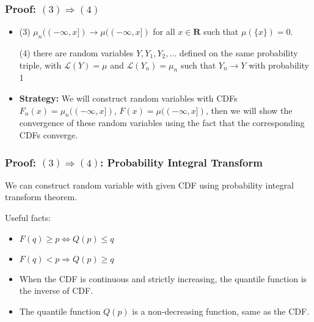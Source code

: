 \documentclass[handout]{beamer}
\begin{document}
\frame
{
  \frametitle{Proof: $(3) \Rightarrow (4)$ } 

   \begin{itemize}

\item<1-> (3) $\mu_n((-\infty, x])\rightarrow \mu((-\infty, x])$ for all $x\in \mathbf{R}$ such that $\mu(\{x\})=0$.
                                            \vspace{2mm}

              {\color{blue}  (4) there are random variables $Y, Y_1, Y_2, \ldots$ defined on the same probability triple, with $\mathcal{L} (Y)=\mu$ and $\mathcal{L} (Y_n)=\mu_n $ such that $Y_n\rightarrow Y$ with probability 1 }
                                                           \vspace{2mm}

               
\item<2-> \textbf{Strategy:}  We will construct random variables with CDFs $F_n(x)=\mu_n((-\infty, x])$, $F(x)=\mu((-\infty, x])$, then we will show the convergence of these random variables using the fact that the corresponding CDFs converge.
                     
\end{itemize}
}

\frame
{
  \frametitle{Proof: $(3) \Rightarrow (4)$:  Probability Integral Transform} 

We can construct random variable with given CDF using probability integral transform theorem. 

Useful facts:

\begin{itemize}

\item<1->[-] $F(q)\geq p \iff Q(p)\leq q $
                
                                          
\item<2->[-] $F(q)< p \Rightarrow Q(p)\ge q$

                       
\item<3->[-]When the CDF is continuous and strictly increasing, the quantile function is the inverse of CDF.  
                       
                       
\item<4->[-] The quantile function $Q(p)$ is a non-decreasing function, same as the CDF.

\end{itemize}

}
\end{document}
